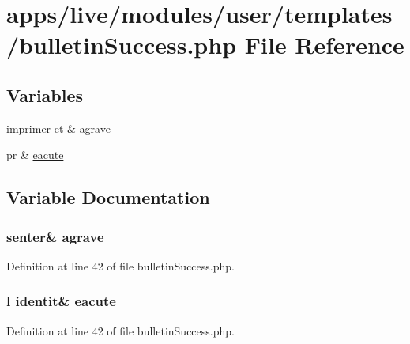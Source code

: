 \hypertarget{live_2modules_2user_2templates_2bulletin_success_8php}{\section{apps/live/modules/user/templates/bulletin\-Success.php File Reference}
\label{live_2modules_2user_2templates_2bulletin_success_8php}
}
\subsection*{Variables}
\begin{DoxyCompactItemize}
\item 
imprimer et \& \hyperlink{live_2modules_2user_2templates_2bulletin_success_8php_a0662d58eebb5df647b253a51d7d6fc13}{agrave}
\item 
pr \& \hyperlink{live_2modules_2user_2templates_2bulletin_success_8php_a20f2fa4a4bb1e8f7975b3600b2c21413}{eacute}
\end{DoxyCompactItemize}


\subsection{Variable Documentation}
\hypertarget{live_2modules_2user_2templates_2bulletin_success_8php_a0662d58eebb5df647b253a51d7d6fc13}{
\subsubsection[{agrave}]{\setlength{\rightskip}{0pt plus 5cm}senter\& agrave}}\label{live_2modules_2user_2templates_2bulletin_success_8php_a0662d58eebb5df647b253a51d7d6fc13}


Definition at line 42 of file bulletin\-Success.\-php.

\hypertarget{live_2modules_2user_2templates_2bulletin_success_8php_a20f2fa4a4bb1e8f7975b3600b2c21413}{
\subsubsection[{eacute}]{\setlength{\rightskip}{0pt plus 5cm}l identit\& eacute}}\label{live_2modules_2user_2templates_2bulletin_success_8php_a20f2fa4a4bb1e8f7975b3600b2c21413}


Definition at line 42 of file bulletin\-Success.\-php.

